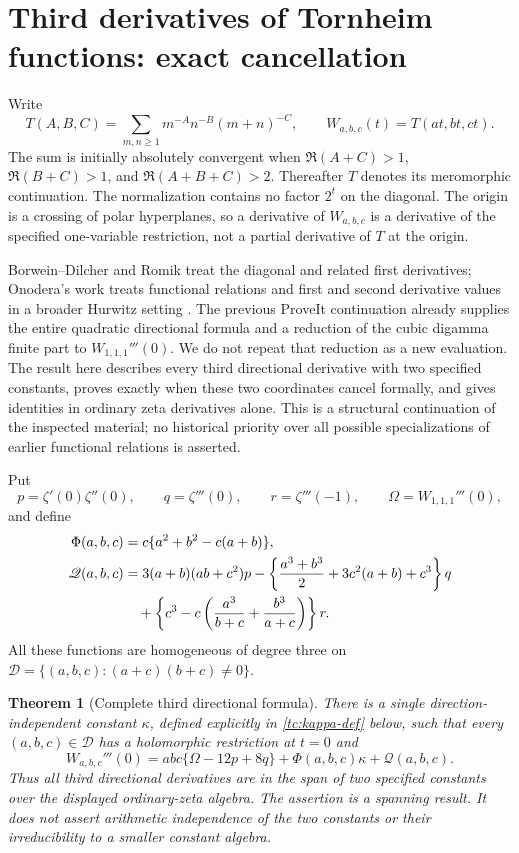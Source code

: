 \documentclass[11pt,a4paper]{article}
\numberwithin{equation}{section}
\theoremstyle{plain}
\newtheorem{theorem}{Theorem}[section]
\theoremstyle{definition}
\theoremstyle{remark}
\begin{document}
\section{Third derivatives of Tornheim functions: exact cancellation}
\label{tc:sec}

Write
\[
 T(A,B,C)=\sum_{m,n\ge1}m^{-A}n^{-B}(m+n)^{-C},
 \qquad W_{a,b,c}(t)=T(at,bt,ct).
\]
The sum is initially absolutely convergent when
$\Re(A+C)>1$, $\Re(B+C)>1$, and $\Re(A+B+C)>2$.
Thereafter $T$ denotes its meromorphic continuation.  The normalization
contains no factor $2^t$ on the diagonal.  The origin is a crossing of
polar hyperplanes, so a derivative of $W_{a,b,c}$ is a derivative of
the specified one-variable restriction, not a partial derivative of
$T$ at the origin.

Borwein--Dilcher and Romik treat the diagonal and related first
derivatives; Onodera's work treats functional relations and first and
second derivative values in a broader Hurwitz setting
\cite{TC:BD,TC:Romik,TC:Onodera2014,TC:Onodera2021}.
The previous ProveIt continuation already supplies the entire
quadratic directional formula and a reduction of the cubic digamma
finite part to $W_{1,1,1}'''(0)$.  We do not repeat that reduction as a
new evaluation.  The result here describes every third directional
derivative with two specified constants, proves exactly when these
two coordinates cancel formally, and gives identities in ordinary
zeta derivatives alone.  This is a structural continuation of the
inspected material; no historical priority over all possible
specializations of earlier functional relations is asserted.

Put
\[
 p=\zeta'(0)\zeta''(0),\qquad q=\zeta'''(0),\qquad
 r=\zeta'''(-1),\qquad \Omega=W_{1,1,1}'''(0),
\]
and define
\begin{align}
 \Phi(a,b,c)&=c\{a^2+b^2-c(a+b)\},\label{tc:Phi}\\
 \mathscr Q(a,b,c)
 &=3(a+b)(ab+c^2)p
   -\left\{\frac{a^3+b^3}{2}+3c^2(a+b)+c^3\right\}q\notag\\
 &\quad+\left\{c^3-c\left(\frac{a^3}{b+c}
                              +\frac{b^3}{a+c}\right)\right\}r.
 \label{tc:Q}
\end{align}
All these functions are homogeneous of degree three on
$\mathscr D=\{(a,b,c):(a+c)(b+c)\ne0\}$.

\begin{theorem}[Complete third directional formula]
\label{tc:main}
There is a single direction-independent constant $\kappa$, defined
explicitly in \eqref{tc:kappa-def} below, such that every
$(a,b,c)\in\mathscr D$ has a holomorphic restriction at $t=0$ and
\begin{equation}
 \boxed{\displaystyle
 W_{a,b,c}'''(0)
   =abc\{\Omega-12p+8q\}
      +\Phi(a,b,c)\kappa+\mathscr Q(a,b,c).}
 \label{tc:third}
\end{equation}
Thus all third directional derivatives are in the span of two
specified constants over the displayed ordinary-zeta algebra.
The assertion is a spanning result.  It does not assert arithmetic
independence of the two constants or their irreducibility to a
smaller constant algebra.
\end{theorem}
\end{document}
